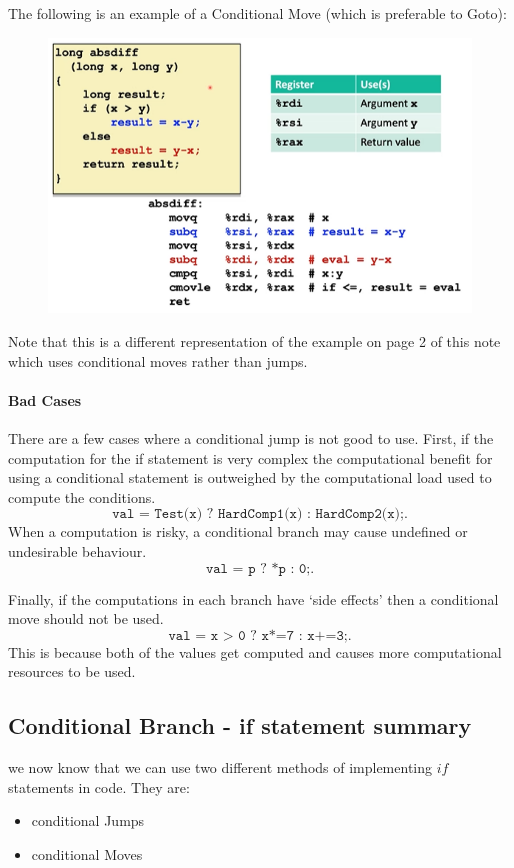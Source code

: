 \documentclass[12pt]{book}
\begin{document}
The following is an example of a Conditional Move (which is preferable to Goto):
\begin{figure}[h]
        \centering
        \includegraphics[scale = 0.51]{./figures/ifThenMoveEx}
\end{figure}

Note that this is a different representation of the example on page 2 of this note which uses conditional moves rather than
jumps.

\paragraph{Bad Cases}
There are a few cases where a conditional jump is not good to use. First, if the computation for the if statement is very
complex the computational benefit for using a conditional statement is outweighed by the computational load used to 
compute the conditions.
\[
\texttt{val = Test(x) ? HardComp1(x) : HardComp2(x);}
.\] 
When a computation is risky, a conditional branch may cause undefined or undesirable behaviour.
\[
\texttt{val = p ? *p : 0;}
.\] 

Finally, if the computations in each branch have `side effects' then a conditional move should not be used.
\[
\texttt{val = x > 0 ? x*=7 : x+=3;}
.\] 
This is because both of the values get computed and causes more computational resources to be used.

\subsection*{Conditional Branch - if statement summary}
we now know that we can use two different methods of implementing $if$ statements in code. They are:
\begin{itemize}
        \item conditional Jumps
        \item conditional Moves
\end{itemize}
\end{document}
